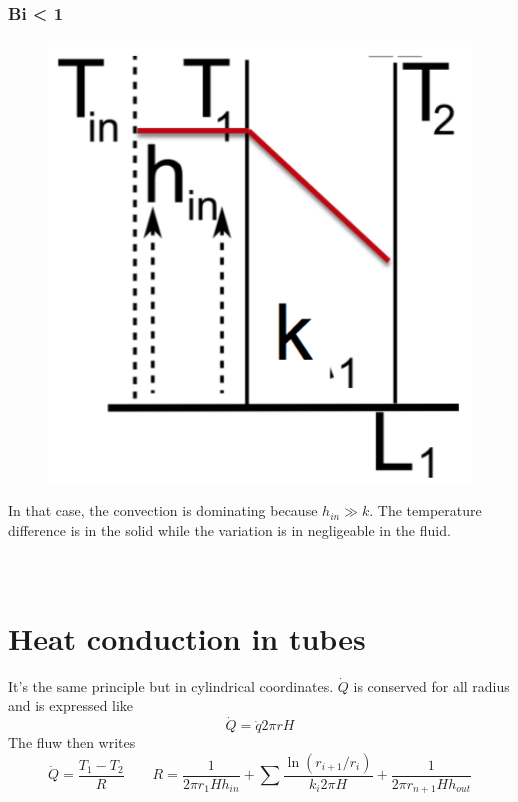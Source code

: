  			 \subsubsection{Bi < 1}
	 			\begin{figure}
 				\vspace{-5mm}
 				\includegraphics[scale=0.35]{ch3/9}
 				\end{figure}
 				In that case, the convection is dominating because $h_{in} \gg k$. The temperature difference is in the solid while the variation is in negligeable in the fluid. \\\\\\
 			
\section{Heat conduction in tubes}
	It's the same principle but in cylindrical coordinates. $\dot{Q}$ is conserved for all radius and is expressed like 
	\begin{equation}
		\dot{Q} = \dot{q}2\pi r H
	\end{equation}
 	The fluw then writes 
 	\begin{equation}
 			\dot{Q} = \frac{T_1-T_2}{R}\qquad R = \frac{1}{2\pi r_1 H h_{in}} + \sum \frac{\ln (r_{i+1}/r_i)}{k_i 2\pi H} + \frac{1}{2 \pi r_{n+1}Hh_{out}}
 	\end{equation}